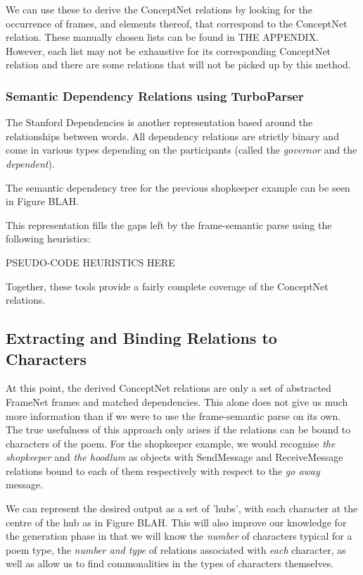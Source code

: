 We can use these to derive the ConceptNet relations by looking for the occurrence of frames, and elements thereof, that correspond to the ConceptNet relation. These manually chosen lists can be found in THE APPENDIX. However, each list may not be exhaustive for its corresponding ConceptNet relation and there are some relations that will not be picked up by this method.


\subsubsection{Semantic Dependency Relations using TurboParser}
\label{sec:turbo}

The Stanford Dependencies is another representation based around the relationships between words. All dependency relations are strictly binary and come in various types depending on the participants (called the \textit{governor} and the \textit{dependent}).

The semantic dependency tree for the previous shopkeeper example can be seen in Figure BLAH.

This representation fills the gaps left by the frame-semantic parse using the following heuristics:

PSEUDO-CODE HEURISTICS HERE

Together, these tools provide a fairly complete coverage of the ConceptNet relations.


\subsection{Extracting and Binding Relations to Characters}

At this point, the derived ConceptNet relations are only a set of abstracted FrameNet frames and matched dependencies. This alone does not give us much more information than if we were to use the frame-semantic parse on its own. The true usefulness of this approach only arises if the relations can be bound to characters of the poem. For the shopkeeper example, we would recognise \textit{the shopkeeper} and \textit{the hoodlum} as objects with SendMessage and ReceiveMessage relations bound to each of them respectively with respect to the \textit{go away} message.

We can represent the desired output as a set of 'hubs', with each character at the centre of the hub as in Figure BLAH. This will also improve our knowledge for the generation phase in that we will know the \textit{number} of characters typical for a poem type, the \textit{number and type} of relations associated with \textit{each} character, as well as allow us to find commonalities in the types of characters themselves.


